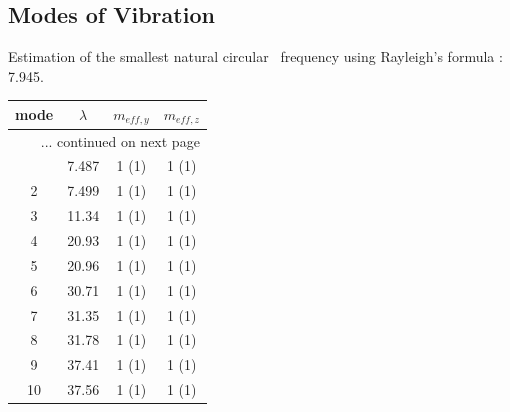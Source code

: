 \documentclass{article}%
\begin{document}
\subsection{Modes of Vibration}%
\label{subsec:ModesofVibration}%
Estimation of the smallest natural circular \
    frequency using Rayleigh's formula : 7.945.%
\begin{longtable}{| c | c | c c |}%
\hline%
mode&$\lambda$&$m_{eff,y}$&$m_{eff,z}$\\%
\hline%
\endhead%
\hline%
\multicolumn{4}{r}{... continued on next page}\\%
\endfoot%
\hline%
\endlastfoot%
1&7.487&1 (1)&1 (1)\\%
2&7.499&1 (1)&1 (1)\\%
3&11.34&1 (1)&1 (1)\\%
4&20.93&1 (1)&1 (1)\\%
5&20.96&1 (1)&1 (1)\\%
6&30.71&1 (1)&1 (1)\\%
7&31.35&1 (1)&1 (1)\\%
8&31.78&1 (1)&1 (1)\\%
9&37.41&1 (1)&1 (1)\\%
10&37.56&1 (1)&1 (1)\\%
\end{longtable}

%
\end{document}

